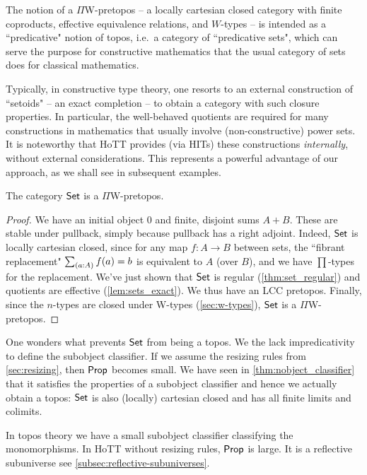 The notion of a $\Pi$W-pretopos -- a locally cartesian closed category with finite coproducts, effective equivalence relations, and $W$-types -- is intended as a ``predicative" notion of topos, i.e.\ a category of ``predicative sets", which can serve the purpose for constructive mathematics that the usual category of sets does for classical mathematics.  

Typically, in constructive type theory, one resorts to an external construction of ``setoids" -- an exact completion -- to obtain a category with such closure properties.  In particular, the well-behaved quotients are required for many constructions in mathematics that usually involve (non-constructive) power sets.  It is noteworthy that HoTT  provides (via HITs) these constructions \emph{internally}, without external considerations.  This represents a powerful advantage of our approach, as we shall see in subsequent examples.

\begin{thm} The category $\mathsf{Set}$ is a $\Pi$W-pretopos.
\end{thm}
\begin{proof}
We have an initial object $0$ and finite, disjoint sums $A+B$.  These are stable under pullback, simply because pullback has a right adjoint.  Indeed, $\mathsf{Set}$ is locally cartesian closed, since for any map $f:A\to B$ between sets, the ``fibrant replacement" $\sm{a:A}f(a)=b$ is equivalent to $A$ (over $B$), and we have $\prod$-types for the replacement.
We've just shown that $\mathsf{Set}$ is regular (\autoref{thm:set_regular}) and quotients are effective (\autoref{lem:sets_exact}). We thus have an LCC pretopos. Finally, since the $n$-types are closed under W-types
(\autoref{sec:w-types}), $\mathsf{Set}$ is a $\Pi$W-pretopos. 
\end{proof}

One wonders what prevents $\mathsf{Set}$ from being a topos. We the lack impredicativity to define the subobject classifier. If we
assume the resizing rules from \autoref{sec:resizing}, then $\mathsf{Prop}$ becomes small. We have seen in
\autoref{thm:nobject_classifier} that it satisfies the properties of a subobject classifier and hence we actually
obtain a topos: $\mathsf{Set}$ is also (locally) cartesian closed and has all finite limits and colimits.


In topos theory we have a small subobject classifier classifying the monomorphisms.
In HoTT without resizing rules, $\mathsf{Prop}$ is large. It is a reflective subuniverse see \autoref{subsec:reflective-subuniverses}.

